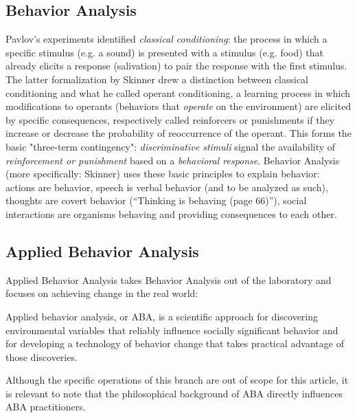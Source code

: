 \documentclass[letterpaper,11pt,twocolumn]{article}
\begin{document}
\subsection*{Behavior Analysis}
Pavlov's experiments identified \textit{classical conditioning}: the process in which a specific stimulus (e.g. a sound) is presented with a stimulus (e.g. food) that already elicits a response (salivation) to pair the response with the first stimulus\cite{iClassicalConditioning2023}. The latter formalization by Skinner drew a distinction between classical conditioning and what he called operant conditioning, a learning process in which modifications to operants (behaviors that \textit{operate} on the environment) are elicited by specific consequences, respectively called reinforcers or punishments if they increase or decrease the probability of reoccurrence of the operant. This forms the basic "three-term contingency": \textit{discriminative stimuli} signal the availability of \textit{reinforcement or punishment} based on a \textit{behavioral response}. Behavior Analysis (more specifically: Skinner) uses these basic principles to explain behavior: actions are behavior, speech is verbal behavior (and to be analyzed as such), thoughts are covert behavior (\enquote{Thinking is behaving (page 66)}\cite{skinnerBehaviorism1976}), social interactions are organisms behaving and providing consequences to each other.

\subsection*{Applied Behavior Analysis}
Applied Behavior Analysis takes Behavior Analysis out of the laboratory and focuses on achieving change in the real world:
\begin{displayquote}
    Applied behavior analysis, or ABA, is a scientific approach for discovering environmental variables that reliably influence socially significant behavior and for developing a technology of behavior change that takes practical advantage of those discoveries.
    \cite{cooperAppliedBehaviorAnalysis2020}
\end{displayquote}
Although the specific operations of this branch are out of scope for this article, it is relevant to note that the philosophical background of ABA directly influences ABA practitioners.
\end{document}
